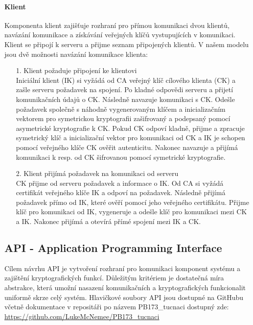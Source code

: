 \documentclass[a4paper, 12pt, titlepage]{article}
\begin{document}
\paragraph{Klient}
Komponenta klient zajišťuje rozhraní pro přímou komunikaci dvou klientů, navázání 
komunikace a získávání veřejných klíčů vystupujících v komunikaci. Klient se 
připojí k serveru a přijme seznam připojených klientů. V našem modelu jsou dvě možnosti
navázání komunikace klienta:

\begin{itemize}



\item[1.] Klient požaduje připojení ke klientovi\\
Iniciální klient (IK) si vyžádá od CA veřejný klíč cílového klienta (CK) 
a zašle serveru požadavek na spojení. Po kladné odpovědi serveru a přijetí 
komunikačních údajů o CK. Následně navazuje komunikaci s CK. Odešle požadavek 
společně s náhodně vygenerovaným klíčem a inicializačním vektorem pro 
symetrickou kryptografii zašifrovaný a podepsaný pomocí asymetrické kryptografie 
k CK. Pokud CK odpoví kladně, přijme a zpracuje symetrický klíč a inicializační 
vektor pro komunikaci od CK a IK je schopen pomocí
veřejného klíče CK ověřit autenticitu. Nakonec navazuje a přijímá 
komunikaci k resp. od CK šifrovanou pomocí
symetrické kryptografie. 

\item[2.]Klient přijímá požadavek na komunikaci od serveru\\
CK přijme od serveru požadavek a informace o IK. Od CA si vyžádá 
certifikát veřejného klíče IK a odpoví na požadavek. Následně přijímá požadavek 
přímo od IK, které ověří pomocí jeho veřejného certifikátu. Přijme klíč pro 
komunikaci od IK, vygeneruje a odešle klíč pro komunikaci mezi CK a IK. Nakonec 
přijímá a otevírá přímé spojení mezi IK a CK.
\end{itemize}

\subsection{API - Application Programming Interface}
Cílem návrhu API je vytvoření rozhraní pro komunikaci komponent systému a 
zajištění kryptografických funkcí. Důležitým kritériem je dostatečná míra 
abstrakce, která umožní nasazení komunikačních a kryptografických funkcionalit uniformě skrze 
celý systém.  
Hlavičkové soubory API jsou dostupné na GitHubu včetně dokumentace v repositáři po názvem 
PB173\_tucnaci dostupný zde: \url{https://github.com/LukeMcNemee/PB173\_tucnaci}
\end{document}
